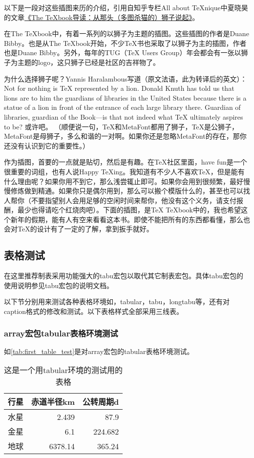 以下是一段对这些插图来历的介绍，引用自知乎专栏All about TeXnique中夏晓昊的文章\href{http://zhuanlan.zhihu.com/LaTeX/19669122}{《The TeXbook导读：从那头（多图杀猫的）狮子说起》}。

在The TeXbook中，有着一系列的以狮子为主题的插图。这些插图的作者是Duane Bibby。也是从The TeXbook开始，不少TeX书也采取了以狮子为主的插图，作者也是Duane Bibby。另外，每年的TUG（TeX Users Group）年会都会有一张以狮子为主题的logo，这只狮子已经是社区的吉祥物了。

为什么选择狮子呢？Yannis Haralambous写道（原文法语，此为转译后的英文）：Not for nothing is TeX represented by a lion. Donald Knuth has told us that lions are to him the guardians of libraries in the United States because there is a statue of a lion in front of the entrance of each large library there. Guardian of libraries, guardian of the Book—is that not indeed what TeX ultimately aspires to be? 或许吧。 （顺便说一句，TeX和MetaFont都用了狮子，TeX是公狮子，MetaFont是母狮子，多么和谐的一对啊。如果你还是忽略MetaFont的存在，那你还没有认识到它的重要性。）

作为插图，首要的一点就是贴切，然后是有趣。在TeX社区里面，have fun是一个很重要的词组，也有人说Happy TeXing。我知道有不少人不喜欢TeX，但是能有什么理由呢？如果你用不到它，那么浅尝辄止即可。如果你会用到很频繁，最好慢慢修炼做到精通。如果你只是偶尔用到，那么可以搬个模版什么的，甚至也可以找人帮你（不要指望别人会用足够的空闲时间来帮你，他没有这个义务，请支付报酬，最少也得请吃个红烧肉吧）。下面的插图，是TeX TeXbook中的，我也希望这个新年的假期，能有人有空来看看这本书。即使不能把所有的东西都看懂，那么也会对TeX的设计有了一定的了解，拿到扳手就好。

\subsection{表格测试}
在这里推荐制表采用功能强大的tabu宏包以取代其它制表宏包。具体tabu宏包的使用说明参见tabu宏包的说明文档。

以下节分别用来测试各种表格环境如，tabular，tabu，longtabu等，还有对caption格式的修改和测试。以下表格样式全部采用三线表。

\subsubsection{array宏包tabular表格环境测试}
如\autoref{tab:first_table_test}是对array宏包的tabular表格环境测试。
\begin{table}[htbp]
	\centering
	\caption{这是一个用tabular环境的测试用的表格}\label{tab:first_table_test}
    \begin{tabular}{lrr}
    \toprule
    \textbf{行星}     & \textbf{赤道半径}km & \textbf{公转周期}d \\
    \midrule
    水星     & 2.439  & 87.9 \\
    金星     & 6.1    & 224.682 \\
    地球     & 6378.14 & 365.24 \\
    \bottomrule
    \end{tabular}%
\end{table}

